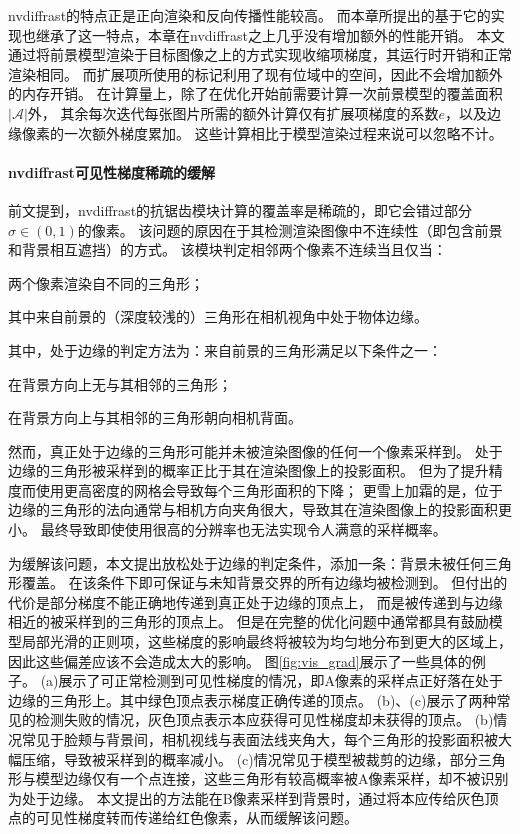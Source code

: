 nvdiffrast的特点正是正向渲染和反向传播性能较高。
而本章所提出的基于它的实现也继承了这一特点，本章在nvdiffrast之上几乎没有增加额外的性能开销。
本文通过将前景模型渲染于目标图像之上的方式实现收缩项梯度，其运行时开销和正常渲染相同。
而扩展项所使用的标记利用了现有位域中的空间，因此不会增加额外的内存开销。
在计算量上，除了在优化开始前需要计算一次前景模型的覆盖面积$|\mathcal{A}|$外，
其余每次迭代每张图片所需的额外计算仅有扩展项梯度的系数$e$，以及边缘像素的一次额外梯度累加。
这些计算相比于模型渲染过程来说可以忽略不计。

\paragraph{nvdiffrast可见性梯度稀疏的缓解}
前文提到，nvdiffrast的抗锯齿模块计算的覆盖率是稀疏的，即它会错过部分$\sigma\in(0,1)$的像素。
该问题的原因在于其检测渲染图像中不连续性（即包含前景和背景相互遮挡）的方式。
该模块判定相邻两个像素不连续当且仅当：
\begin{enumerate*}
\item 两个像素渲染自不同的三角形；
\item 其中来自前景的（深度较浅的）三角形在相机视角中处于物体边缘。
\end{enumerate*}
其中，处于边缘的判定方法为：来自前景的三角形满足以下条件之一：
\begin{enumerate*}
\item 在背景方向上无与其相邻的三角形；
\item 在背景方向上与其相邻的三角形朝向相机背面。
\end{enumerate*}
然而，真正处于边缘的三角形可能并未被渲染图像的任何一个像素采样到。
处于边缘的三角形被采样到的概率正比于其在渲染图像上的投影面积。
但为了提升精度而使用更高密度的网格会导致每个三角形面积的下降；
更雪上加霜的是，位于边缘的三角形的法向通常与相机方向夹角很大，导致其在渲染图像上的投影面积更小。
最终导致即使使用很高的分辨率也无法实现令人满意的采样概率。

为缓解该问题，本文提出放松处于边缘的判定条件，添加一条：背景未被任何三角形覆盖。
在该条件下即可保证与未知背景交界的所有边缘均被检测到。
但付出的代价是部分梯度不能正确地传递到真正处于边缘的顶点上，
而是被传递到与边缘相近的被采样到的三角形的顶点上。
但是在完整的优化问题中通常都具有鼓励模型局部光滑的正则项，这些梯度的影响最终将被较为均匀地分布到更大的区域上，因此这些偏差应该不会造成太大的影响。
图\ref{fig:vis_grad}展示了一些具体的例子。
(a)展示了可正常检测到可见性梯度的情况，即A像素的采样点正好落在处于边缘的三角形上。其中绿色顶点表示梯度正确传递的顶点。
(b)、(c)展示了两种常见的检测失败的情况，灰色顶点表示本应获得可见性梯度却未获得的顶点。
(b)情况常见于脸颊与背景间，相机视线与表面法线夹角大，每个三角形的投影面积被大幅压缩，导致被采样到的概率减小。
(c)情况常见于模型被裁剪的边缘，部分三角形与模型边缘仅有一个点连接，这些三角形有较高概率被A像素采样，却不被识别为处于边缘。
本文提出的方法能在B像素采样到背景时，通过将本应传给灰色顶点的可见性梯度转而传递给红色像素，从而缓解该问题。


